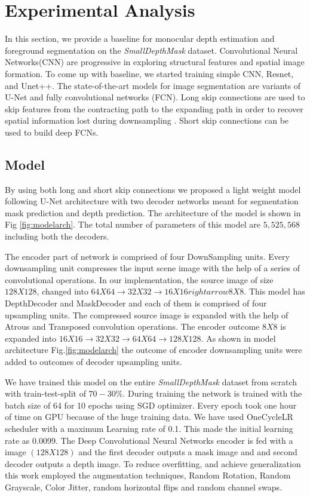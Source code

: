 \documentclass[review]{cvpr}
\begin{document}
\section{Experimental Analysis}
In this section, we provide a baseline for monocular depth estimation and foreground segmentation on the \textit{SmallDepthMask} dataset. Convolutional Neural Networks(CNN) are progressive in exploring structural features and spatial image formation. To come up with baseline, we started  training simple CNN, Resnet, and Unet++. The state-of-the-art models for image segmentation are variants of U-Net and fully convolutional networks (FCN)\cite{drozdzal2016importance}. Long skip connections are used to skip features from the contracting path to the expanding path in order to recover spatial information lost during downsampling \cite{zhou2019unet++}. Short skip connections can be used to build deep FCNs. 

\subsection{Model}
By using both long and short skip connections we proposed a light weight model following U-Net architecture with two decoder networks meant for segmentation mask prediction and depth prediction. The architecture of the model is shown in Fig \ref{fig:modelarch}. The total number of parameters of this model are $5,525,568$ including both the decoders. 

The encoder part of network is comprised of four DownSampling units. Every downsampling unit compresses the input scene image with the help of a series of convolutional operations. In our implementation, the source image of size $128 X 128$, changed into $64X64 \rightarrow 32X32 \rightarrow  16X16 rightarrow 8X8$. This model has DepthDecoder and MaskDecoder and each of them is comprised of four upsampling units. The compressed source image is expanded with the help of Atrous and Transposed convolution operations. The encoder outcome $8 X 8$ is expanded into $16X16 \rightarrow 32X32 \rightarrow 64X64 \rightarrow 128X128$. As shown in model architecture Fig.\ref{fig:modelarch} the outcome of encoder downsampling units were added to outcomes of decoder upsampling units.

We have trained this model on the entire \textit{SmallDepthMask} dataset from scratch with train-test-split of $70-30\%$. During training the network is trained with the batch size of 64 for 10 epochs using SGD optimizer\cite{bottou2010large}. Every epoch took one hour of time on GPU because of the huge training data. We have used OneCycleLR scheduler \cite{smith2018disciplined} with a maximum Learning rate of 0.1. This made the initial learning rate as 0.0099. The Deep Convolutional Neural Networks encoder is fed with a image $(128 X 128)$ and the first decoder outputs a mask image and and second decoder outputs a depth image. To reduce overfitting\cite{perez2017effectiveness}, and achieve generalization this work employed the augmentation techniques, Random Rotation, Random Grayscale, Color Jitter, random horizontal flips and random channel swaps. 
\end{document}
